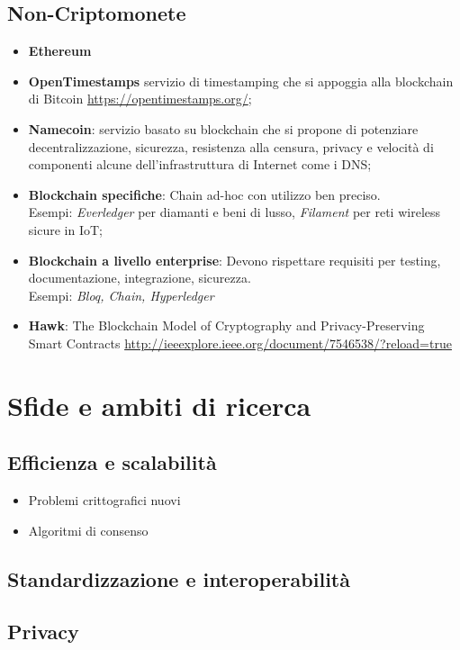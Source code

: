     \subsection{Non-Criptomonete}
        \begin{itemize}
            \item \textbf{Ethereum}
            \item \textbf{OpenTimestamps} servizio di timestamping che si appoggia alla blockchain di Bitcoin \url{https://opentimestamps.org/};
            \item \textbf{Namecoin}: servizio basato su blockchain che si propone di potenziare decentralizzazione, sicurezza, resistenza alla censura, privacy e velocità di componenti alcune dell'infrastruttura di Internet come i DNS;
            \item \textbf{Blockchain specifiche}: Chain ad-hoc con utilizzo ben preciso. \\
                Esempi: \emph{Everledger} per diamanti e beni di lusso, \emph{Filament} per reti wireless sicure in IoT;
            \item \textbf{Blockchain a livello enterprise}: Devono rispettare requisiti per testing, documentazione, integrazione, sicurezza. \\
                Esempi: \emph{Bloq, Chain, Hyperledger}
            \item \textbf{Hawk}: The Blockchain Model of Cryptography and Privacy-Preserving Smart Contracts \url{http://ieeexplore.ieee.org/document/7546538/?reload=true}
        \end{itemize}

\section{Sfide e ambiti di ricerca}
    \subsection{Efficienza e scalabilità}
        \begin{itemize}
            \item Problemi crittografici nuovi
            \item Algoritmi di consenso
        \end{itemize}
    \subsection{Standardizzazione e interoperabilità}
    \subsection{Privacy}
